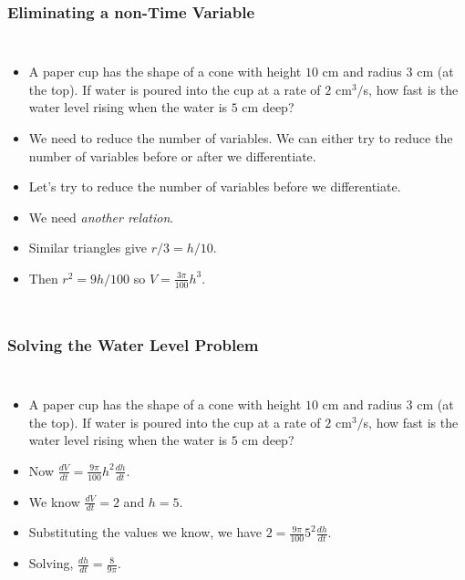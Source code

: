 \documentclass[serif,ignorenonframetext]{beamer}
\newcommand{\ds}{\displaystyle}
\begin{document}
\begin{frame}
  \frametitle{Eliminating a non-Time Variable}
  \begin{columns}
  \begin{itemize}[<+->]
  \item A paper cup has the shape of a cone with height $10$ cm and
    radius $3$ cm (at the top).  If water is poured into the cup at
    a rate of $2$ cm$^3/$s, how fast is the water level rising when
    the water is $5$ cm deep?
  \item We need to reduce the number of variables.  We can either
    try to reduce the number of variables before or after we 
    differentiate.
  \item Let's try to reduce the number of variables before we
    differentiate.
  \item We need \textit{another relation}.
  \item Similar triangles give $r/3 = h/10$.
  \item Then $r^2=9h/100$ so $\ds V=\frac{3\pi}{100} h^3$.
  \end{itemize}
  \end{columns}
\end{frame}

\begin{frame}
  \frametitle{Solving the Water Level Problem}
  \begin{columns}
  \begin{itemize}[<+->]
  \item A paper cup has the shape of a cone with height $10$ cm and
    radius $3$ cm (at the top).  If water is poured into the cup at
    a rate of $2$ cm$^3/$s, how fast is the water level rising when
    the water is $5$ cm deep?
  \item Now $\ds \frac{dV}{dt} = \frac{9\pi}{100} h^2 \frac{dh}{dt}$.
  \item We know $\ds \frac{dV}{dt}= 2$ and $h=5$.
  \item Substituting the values we know, we have
    $\ds 2 = \frac{9\pi}{100} 5^2 \frac{dh}{dt}$.
  \item Solving, $\ds \frac{dh}{dt}= \frac{8}{9\pi}$.
  \end{itemize}
  \end{columns}
\end{frame}
\end{document}
